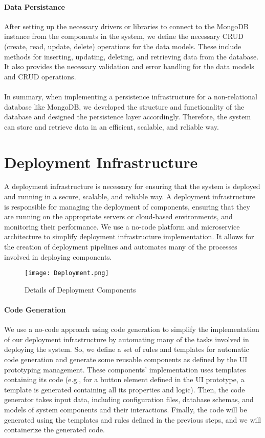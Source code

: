 \paragraph{Data Persistance}
After setting up the necessary drivers or libraries to connect to the MongoDB instance from the components in the system, we define the necessary CRUD (create, read, update, delete) operations for the data models.
These include methods for inserting, updating, deleting, and retrieving data from the database. 
It also provides the necessary validation and error handling for the data models and CRUD operations.\\\\
In summary, when implementing a persistence infrastructure for a non-relational database like MongoDB, we developed the structure and functionality of the database and designed the persistence layer accordingly. 
Therefore, the system can store and retrieve data in an efficient, scalable, and reliable way.

\clearpage
\section{Deployment Infrastructure}
\label{sc:section:deployment}
A deployment infrastructure is necessary for ensuring that the system is deployed and running in a secure, scalable, and reliable way. 
A deployment infrastructure is responsible for managing the deployment of components, ensuring that they are running on the appropriate servers or cloud-based environments, and monitoring their performance.
We use a no-code platform and microservice architecture to simplify deployment infrastructure implementation. It allows for the creation of deployment pipelines and automates many of the processes involved in deploying components.

\begin{figure}[htbp!]
    \centering    
    \texttt{[image: Deployment.png]} 
    \caption[Details of Deployment Components]{Details of Deployment Components}
    \label{fig:sc:deployment}
\end{figure}

\paragraph{Code Generation}
We use a no-code approach using code generation to simplify the implementation of our deployment infrastructure by automating many of the tasks involved in deploying the system.
So, we define a set of rules and templates for automatic code generation and generate some reusable components as defined by the UI prototyping management. 
These components' implementation uses templates containing its code (e.g., for a button element defined in the UI prototype, a template is generated containing all its properties and logic).
Then, the code generator takes input data, including configuration files, database schemas, and models of system components and their interactions. 
Finally, the code will be generated using the templates and rules defined in the previous steps, and we will containerize the generated code. 

